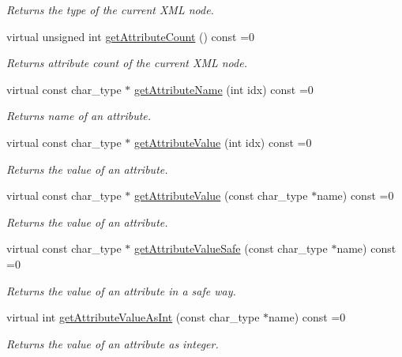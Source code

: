 \begin{DoxyCompactItemize}
\begin{DoxyCompactList}\small\item\em Returns the type of the current X\+ML node. \end{DoxyCompactList}\item 
virtual unsigned int \hyperlink{classirr_1_1io_1_1IIrrXMLReader_a66045277298db8d3db485ac2f5ea59c5}{get\+Attribute\+Count} () const  =0
\begin{DoxyCompactList}\small\item\em Returns attribute count of the current X\+ML node. \end{DoxyCompactList}\item 
virtual const char\+\_\+type $\ast$ \hyperlink{classirr_1_1io_1_1IIrrXMLReader_a5aa56a2623da10898f1f2bf1f92a243b}{get\+Attribute\+Name} (int idx) const  =0
\begin{DoxyCompactList}\small\item\em Returns name of an attribute. \end{DoxyCompactList}\item 
virtual const char\+\_\+type $\ast$ \hyperlink{classirr_1_1io_1_1IIrrXMLReader_a6b8721b2c9e4bbd165535af26afc6704}{get\+Attribute\+Value} (int idx) const  =0
\begin{DoxyCompactList}\small\item\em Returns the value of an attribute. \end{DoxyCompactList}\item 
virtual const char\+\_\+type $\ast$ \hyperlink{classirr_1_1io_1_1IIrrXMLReader_ad7632e2dd0bc1d3f76ec63e5a42eb4c7}{get\+Attribute\+Value} (const char\+\_\+type $\ast$name) const  =0
\begin{DoxyCompactList}\small\item\em Returns the value of an attribute. \end{DoxyCompactList}\item 
virtual const char\+\_\+type $\ast$ \hyperlink{classirr_1_1io_1_1IIrrXMLReader_a43ab4fd1fe9beb8a4a4ecea7a7e0c766}{get\+Attribute\+Value\+Safe} (const char\+\_\+type $\ast$name) const  =0
\begin{DoxyCompactList}\small\item\em Returns the value of an attribute in a safe way. \end{DoxyCompactList}\item 
virtual int \hyperlink{classirr_1_1io_1_1IIrrXMLReader_ac66b72a442f5f3b103133ceeaf0ce8d2}{get\+Attribute\+Value\+As\+Int} (const char\+\_\+type $\ast$name) const  =0
\begin{DoxyCompactList}\small\item\em Returns the value of an attribute as integer. \end{DoxyCompactList}\item 

\end{DoxyCompactItemize}
